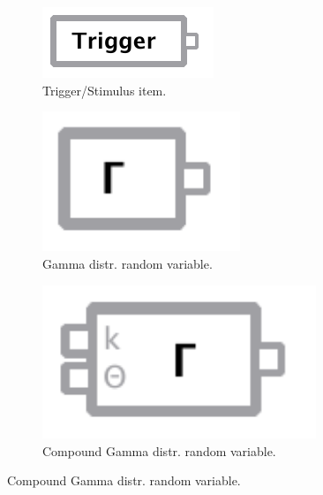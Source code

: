 \begin{figure}[!ht]
 \begin{subfigure}[c]{0.2\textwidth}
   \centering
 	\includegraphics[width=\textwidth]{fig/guitrigger.pdf}
 	\caption{Trigger/Stimulus item.} \label{fig:itemtrigger}
 \end{subfigure}\hfill
 \begin{subfigure}[c]{0.2\textwidth}
   \centering
 	\includegraphics[width=0.65\textwidth]{fig/guigamma.pdf}
 	\caption{Gamma distr. random variable.} \label{fig:itemgamma}
 \end{subfigure}\hfill
 \begin{subfigure}[c]{0.2\textwidth}
   \centering
 	\includegraphics[width=0.9\textwidth]{fig/guigammac.pdf}
 	\caption{Compound Gamma distr. random variable.} \label{fig:itemgammac}

\end{subfigure}
\end{figure}
